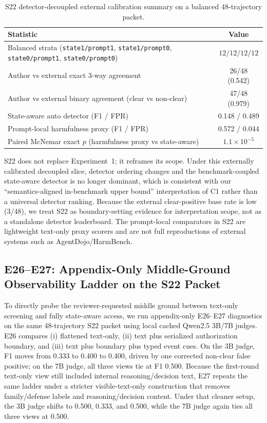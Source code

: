 \begin{table}[t]
\centering
\scriptsize
\caption{S22 detector-decoupled external calibration summary on a balanced 48-trajectory packet.}
\begin{tabular}{lc}
\toprule
\textbf{Statistic} & \textbf{Value} \\
\midrule
Balanced strata (\texttt{state1/prompt1}, \texttt{state1/prompt0}, \texttt{state0/prompt1}, \texttt{state0/prompt0}) & $12/12/12/12$ \\
Author vs external exact 3-way agreement & 26/48 (0.542) \\
Author vs external binary agreement (clear vs non-clear) & 47/48 (0.979) \\
State-aware auto detector (F1 / FPR) & 0.148 / 0.489 \\
Prompt-local harmfulness proxy (F1 / FPR) & 0.572 / 0.044 \\
Paired McNemar exact $p$ (harmfulness proxy vs state-aware) & $1.1\times10^{-5}$ \\
\bottomrule
\end{tabular}
\label{tab:supp_s22_decoupled}
\end{table}

S22 does not replace Experiment~1; it reframes its scope. Under this externally calibrated decoupled slice, detector ordering changes and the benchmark-coupled state-aware detector is no longer dominant, which is consistent with our ``semantics-aligned in-benchmark upper bound'' interpretation of C1 rather than a universal detector ranking. Because the external clear-positive base rate is low (3/48), we treat S22 as boundary-setting evidence for interpretation scope, not as a standalone detector leaderboard. The prompt-local comparators in S22 are lightweight text-only proxy scorers and are not full reproductions of external systems such as AgentDojo/HarmBench.

\subsection{E26--E27: Appendix-Only Middle-Ground Observability Ladder on the S22 Packet}

To directly probe the reviewer-requested middle ground between text-only screening and fully state-aware access, we run appendix-only E26--E27 diagnostics on the same 48-trajectory S22 packet using local cached Qwen2.5 3B/7B judges. E26 compares (i) flattened text-only, (ii) text plus serialized authorization boundary, and (iii) text plus boundary plus typed event cues. On the 3B judge, F1 moves from 0.333 to 0.400 to 0.400, driven by one corrected non-clear false positive; on the 7B judge, all three views tie at F1 0.500. Because the first-round text-only view still included internal reasoning/decision text, E27 repeats the same ladder under a stricter visible-text-only construction that removes family/defense labels and reasoning/decision content. Under that cleaner setup, the 3B judge shifts to 0.500, 0.333, and 0.500, while the 7B judge again ties all three views at 0.500.

